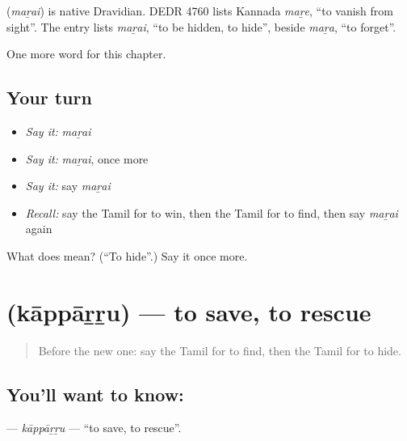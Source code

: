 \begin{cousinweb}
\textbf{} (\emph{maṟai}) is native Dravidian. DEDR 4760 lists Kannada \emph{maṟe}, \textquotedblleft{}to vanish from sight\textquotedblright{}. The entry lists \emph{maṟai}, \textquotedblleft{}to be hidden, to hide\textquotedblright{}, beside \emph{maṟa}, \textquotedblleft{}to forget\textquotedblright{}.
\end{cousinweb}

\begin{grammarlens}[title={What you've built}]
One more word for this chapter.
\end{grammarlens}

\subsection*{Your turn}
\begin{itemize}
\raggedright
  \item \emph{Say it:} \emph{maṟai}
  \item \emph{Say it:} \emph{maṟai}, once more
  \item \emph{Say it:} say \emph{maṟai}
  \item \emph{Recall:} say the Tamil for to win, then the Tamil for to find, then say \emph{maṟai} again
\end{itemize}

\begin{tcolorbox}[breakable,colback=teal!4,colframe=teal!35!black,title={Before you move on}]
What does  mean? (\textquotedblleft{}To hide\textquotedblright{}.) Say it once more.
\end{tcolorbox}
\section[\texorpdfstring{\ta{காப்பாற்று} (kāppāṟṟu)}{காப்பாற்று (kāppāṟṟu)}]{ (kāppāṟṟu) — to save, to rescue}

\label{lesson:TA-C157-kapparru}



\begin{quote}
Before the new one: say the Tamil for to find, then the Tamil for to hide.
\end{quote}

\subsection*{You'll want to know: }
\textbf{} — \emph{kāppāṟṟu} — \textquotedblleft{}to save, to rescue\textquotedblright{}.

